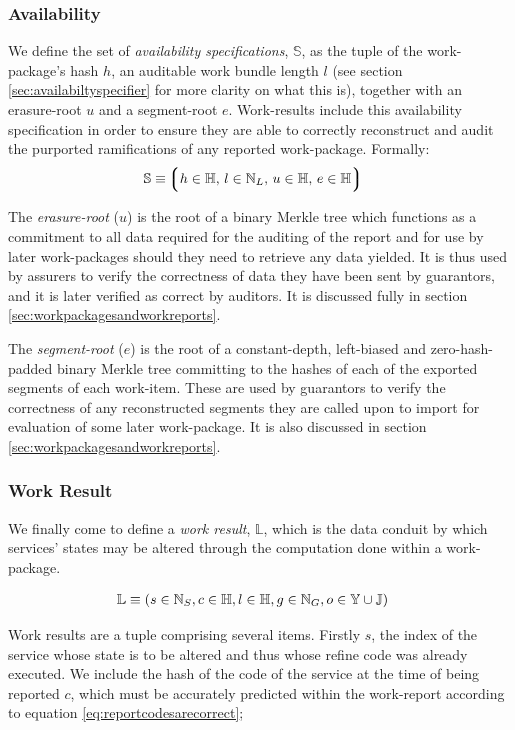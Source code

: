 \subsubsection{Availability}
We define the set of \emph{availability specifications}, $\mathbb{S}$, as the tuple of the work-package's hash $h$, an auditable work bundle length $l$ (see section \ref{sec:availabiltyspecifier} for more clarity on what this is), together with an erasure-root $u$ and a segment-root $e$. Work-results include this availability specification in order to ensure they are able to correctly reconstruct and audit the purported ramifications of any reported work-package. Formally:
\begin{align}
  \mathbb{S} &\equiv \tuple{
    \isa{h}{\H}\ts
    \isa{l}{\N_L}\ts
    \isa{u}{\H}\ts
    \isa{e}{\H}
  }
\end{align}

The \emph{erasure-root} ($u$) is the root of a binary Merkle tree which functions as a commitment to all data required for the auditing of the report and for use by later work-packages should they need to retrieve any data yielded. It is thus used by assurers to verify the correctness of data they have been sent by guarantors, and it is later verified as correct by auditors. It is discussed fully in section \ref{sec:workpackagesandworkreports}.

The \emph{segment-root} ($e$) is the root of a constant-depth, left-biased and zero-hash-padded binary Merkle tree committing to the hashes of each of the exported segments of each work-item. These are used by guarantors to verify the correctness of any reconstructed segments they are called upon to import for evaluation of some later work-package. It is also discussed in section \ref{sec:workpackagesandworkreports}.

\subsubsection{Work Result}
We finally come to define a \emph{work result}, $\mathbb{L}$, which is the data conduit by which services' states may be altered through the computation done within a work-package.

\begin{align}\label{eq:workresult}
  \mathbb{L} &\equiv (s \in \mathbb{N}_S, c \in \mathbb{H}, l \in \mathbb{H}, g \in \mathbb{N}_G, o \in \mathbb{Y} \cup \mathbb{J})
\end{align}

Work results are a tuple comprising several items. Firstly $s$, the index of the service whose state is to be altered and thus whose refine code was already executed. We include the hash of the code of the service at the time of being reported $c$, which must be accurately predicted within the work-report according to equation \ref{eq:reportcodesarecorrect};

